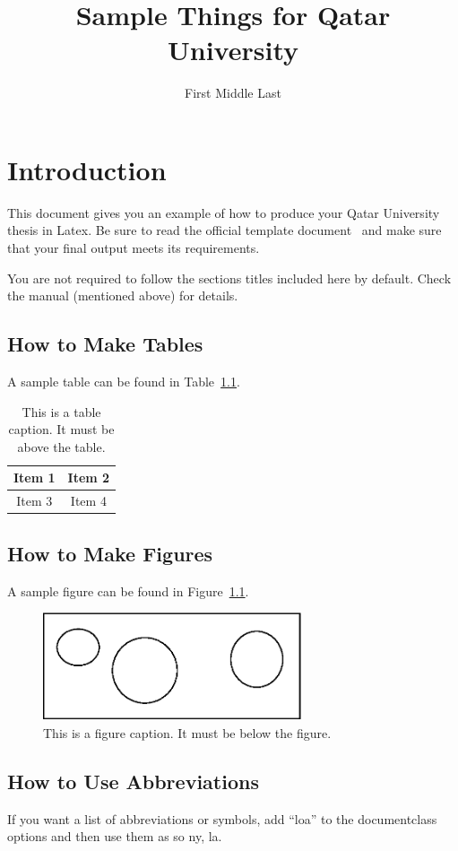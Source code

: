 \documentclass[12pt,lot,lof]{quthesis}
\title{Sample Things for Qatar University}
\author{First Middle Last} %
\begin{document}
\makefrontmatter

\chapter{Introduction}
This document gives you an example of how to produce your Qatar 
University thesis in Latex.  Be sure to read the 
official template document~\cite{qutemp} and make sure that your
final output meets its requirements.

You are not required to follow the sections titles included here by default.
Check the manual (mentioned above) for details.

\section{How to Make Tables}
A sample table can be found in Table~\ref{tab:example}.
\begin{table}[t]
\centering
\caption{This is a table caption.  It must be above the table.}
\begin{tabular}{|c|c|}
\hline
Item 1 & Item 2 \\
\hline
Item 3 & Item 4 \\
\hline
\end{tabular}
\label{tab:example}
\end{table}

\section{How to Make Figures}
A sample figure can be found in Figure~\ref{fig:example}.
\begin{figure}[b]
\centering
\includegraphics[width=3in]{samplefig.eps}
\caption{This is a figure caption.  It must be below the figure.}
\label{fig:example}
\end{figure}

\section{How to Use Abbreviations}
If you want a list of abbreviations or symbols, add ``loa'' to the documentclass
options and then use them as so \ac{ny}, \ac{la}.
\end{document}
